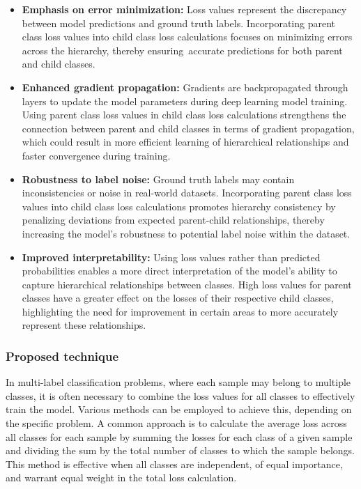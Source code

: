 \documentclass[preprint,3p,times, review]{elsarticle}
\begin{document}
\begin{itemize}
    \item \textbf{Emphasis on error minimization: }Loss values represent the discrepancy between model predictions and ground truth labels. Incorporating parent class loss values into child class loss calculations focuses on minimizing errors across the hierarchy, thereby ensuring~accurate predictions for both parent and child classes.

    \item \textbf{Enhanced gradient propagation:} Gradients are backpropagated through layers to update the model parameters during deep learning model training. Using parent class loss values in child class loss calculations strengthens the connection between parent and child classes in terms of gradient propagation, which could result in more efficient learning of hierarchical relationships and faster convergence during training.

    \item \textbf{Robustness to label noise:} Ground truth labels may contain inconsistencies or noise in real-world datasets. Incorporating parent class loss values into child class loss calculations promotes hierarchy consistency by penalizing deviations from expected parent-child relationships, thereby increasing the model's robustness to potential label noise within the dataset.

    \item \textbf{Improved interpretability:} Using loss values rather than predicted probabilities enables a more direct interpretation of the model's ability to capture hierarchical relationships between classes. High loss values for parent classes have a greater effect on the losses of their respective child classes, highlighting the need for improvement in certain areas to more accurately represent these relationships.
\end{itemize}

\subsubsection{Proposed technique}

In multi-label classification problems, where each sample may belong to multiple classes, it is often necessary to combine the loss values for all classes to effectively train the model. Various methods can be employed to achieve this, depending on the specific problem. A common approach is to calculate the average loss across all classes for each sample by summing the losses for each class of a given sample and dividing the sum by the total number of classes to which the sample belongs. This method is effective when all classes are independent, of equal importance, and warrant equal weight in the total loss calculation.
\end{document}
